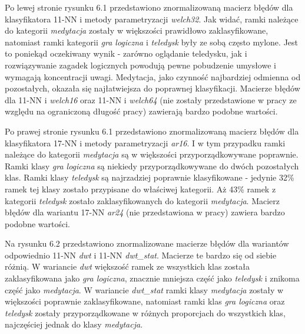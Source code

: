 \documentclass[notitlepage]{report}
\begin{document}
Po lewej stronie rysunku 6.1 przedstawiono znormalizowaną macierz błędów dla klasyfikatora 11-NN i metody parametryzacji \textit{welch32}. Jak widać, ramki należące do kategorii \textit{medytacja} zostały w większości prawidłowo zaklasyfikowane, natomiast ramki kategorii \textit{gra logiczna} i \textit{teledysk} były ze sobą często mylone. Jest to poniekąd oczekiwany wynik - zarówno oglądanie teledysku, jak i rozwiązywanie zagadek logicznych powodują pewne pobudzenie umysłowe i wymagają koncentracji uwagi. Medytacja, jako czynność najbardziej odmienna od pozostałych, okazała się najłatwiejsza do poprawnej klasyfikacji. Macierze błędów dla 11-NN i \textit{welch16} oraz 11-NN i \textit{welch64} (nie zostały przedstawione w pracy ze względu na ograniczoną długość pracy) zawierają bardzo podobne wartości.

Po prawej stronie rysunku 6.1 przedstawiono znormalizowaną macierz błędów dla klasyfikatora 17-NN i metody parametryzacji \textit{ar16}. I w tym przypadku ramki należące do kategorii \textit{medytacja} są w większości przyporządkowywane poprawnie. Ramki klasy \textit{gra logiczna} są niekiedy przyporządkowywane do dwóch pozostałych klas. Ramki klasy \textit{teledysk} są najrzadziej poprawnie klasyfikowane - jedynie 32\% ramek tej klasy zostało przypisane do właściwej kategorii. Aż 43\% ramek z kategorii \textit{teledysk} zostało zaklasyfikowanych do kategorii \textit{medytacja}. Macierz błędów dla wariantu 17-NN \textit{ar24} (nie przedstawiona w pracy) zawiera bardzo podobne wartości.

Na rysunku 6.2 przedstawiono znormalizowane macierze błędów dla wariantów odpowiednio 11-NN \textit{dwt} i 11-NN \textit{dwt\_stat}. Macierze te bardzo się od siebie różnią. W wariancie \textit{dwt} większość ramek ze wszystkich klas została zaklasyfikowana jako \textit{gra logiczna}, znacznie mniejsza część jako \textit{teledysk} i znikoma część jako \textit{medytacja}. W wariancie \textit{dwt\_stat} ramki klasy \textit{medytacja} zostały w większości poprawnie zaklasyfikowane, natomiast ramki klas \textit{gra logiczna} oraz \textit{teledysk} zostały przyporządkowane w różnych proporcjach do wszystkich klas, najczęściej jednak do klasy \textit{medytacja}.
\end{document}
